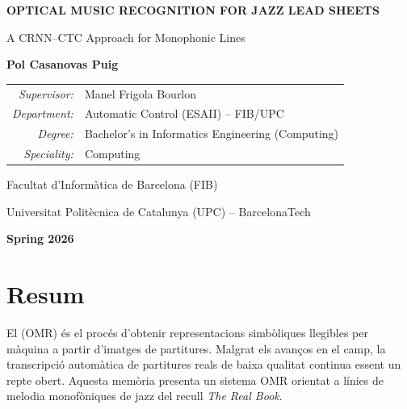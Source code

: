 \documentclass[11pt, a4paper]{report}
\begin{document}

\hypersetup{pageanchor=false}
\begin{titlepage}
    \centering
    \vspace*{2cm}
    {\LARGE\bfseries OPTICAL MUSIC RECOGNITION FOR JAZZ LEAD SHEETS\par}
    \vspace{0.4cm}
    {\large A CRNN--CTC Approach for Monophonic Lines\par}
    \vspace{2.5cm}
    {\large\bfseries Pol Casanovas Puig\par}
    \vspace{1.8cm}
    \begin{tabular}{rl}
        \textit{Supervisor:} & Manel Frigola Bourlon \\[4pt]
        \textit{Department:} & Automatic Control (ESAII) -- FIB/UPC \\[4pt]
        \textit{Degree:}     & Bachelor's in Informatics Engineering (Computing) \\[4pt]
        \textit{Speciality:} & Computing \\
    \end{tabular}
    \vfill
    {\small Facultat d'Inform\`atica de Barcelona (FIB)\par}
    {\small Universitat Polit\`ecnica de Catalunya (UPC) -- BarcelonaTech\par}
    \vspace{0.6cm}
    {\small\bfseries Spring 2026\par}
\end{titlepage}
\hypersetup{pageanchor=true}


\chapter*{Resum}

El  (OMR) \'es el proc\'es d'obtenir representacions simb\`oliques llegibles per m\`aquina a partir d'imatges de partitures. Malgrat els avan\c cos en el camp, la transcripci\'o autom\`atica de partitures reals de baixa qualitat continua essent un repte obert. Aquesta mem\`oria presenta un sistema OMR orientat a l\'inies de melodia monof\`oniques de jazz del recull \textit{The Real Book}.
\end{document}
